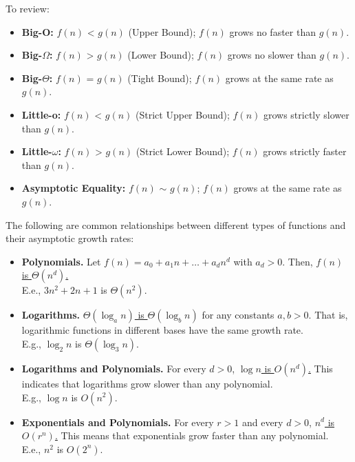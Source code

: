 \begin{Tip}
    To review:
    \begin{itemize}
        \item \textbf{Big-O:} $f(n)$ < $g(n)$ (Upper Bound); $f(n)$ grows no faster than $g(n)$.
        \item \textbf{Big-$\Omega$:} $f(n)$ > $g(n)$ (Lower Bound); $f(n)$ grows no slower than $g(n)$.
        \item \textbf{Big-$\Theta$:} $f(n)$ = $g(n)$ (Tight Bound); $f(n)$ grows at the same rate as $g(n)$.
        \item \textbf{Little-o:} $f(n)$ < $g(n)$ (Strict Upper Bound); $f(n)$ grows strictly slower than $g(n)$.
        \item \textbf{Little-$\omega$:} $f(n)$ > $g(n)$ (Strict Lower Bound); $f(n)$ grows strictly faster than $g(n)$.
        \item \textbf{Asymptotic Equality:} $f(n)$ $\sim$ $g(n)$; $f(n)$ grows at the same rate as $g(n)$.
    \end{itemize}
\end{Tip}

\begin{theo}

    The following are common relationships between different types of functions and their asymptotic growth rates:

    \begin{itemize}
        \item \textbf{Polynomials.} Let $f(n) = a_0 + a_1 n + \dots + a_d n^d$ with $a_d > 0$. Then, \underline{$f(n)$ is $\Theta(n^d)$.}\\
        E.e., $3n^2+2n+1$ is $\Theta(n^2)$.
        
        \item \textbf{Logarithms.} \underline{$\Theta(\log_a n)$ is $\Theta(\log_b n)$} for any constants $a, b > 0$. That is, logarithmic functions in different bases have the same growth rate.\\
        E.g., $\log_2 n$ is $\Theta(\log_3 n)$.
        
        \item \textbf{Logarithms and Polynomials.} For every $d > 0$, \underline{$\log n$ is $O(n^d)$.} This indicates that logarithms grow slower than any polynomial.\\
        E.g., $\log n$ is $O(n^2)$.
        
        \item \textbf{Exponentials and Polynomials.} For every $r > 1$ and every $d > 0$, \underline{$n^d$ is $O(r^n)$.} This means that exponentials grow faster than any polynomial.\\
        E.e., $n^2$ is $O(2^n)$.
    \end{itemize}
\end{theo}

